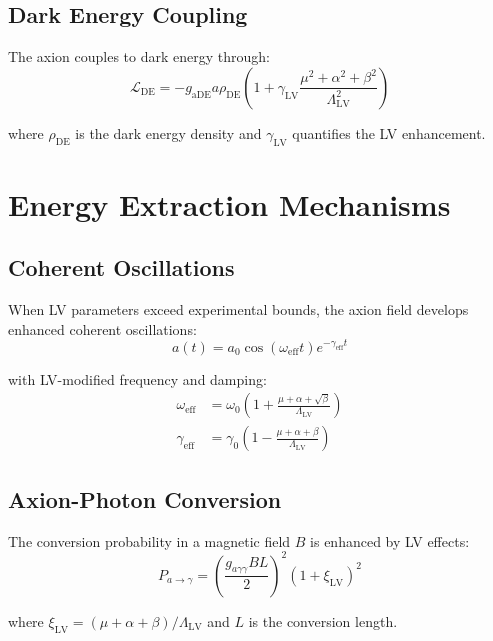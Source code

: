 \documentclass[11pt]{article}
\begin{document}
\subsection{Dark Energy Coupling}

The axion couples to dark energy through:
\begin{equation}
\mathcal{L}_{\text{DE}} = -g_{\text{aDE}} a \rho_{\text{DE}} \left(1 + \gamma_{\text{LV}} \frac{\mu^2 + \alpha^2 + \beta^2}{\Lambda_{\text{LV}}^2}\right)
\end{equation}

where $\rho_{\text{DE}}$ is the dark energy density and $\gamma_{\text{LV}}$ quantifies the LV enhancement.

\section{Energy Extraction Mechanisms}

\subsection{Coherent Oscillations}

When LV parameters exceed experimental bounds, the axion field develops enhanced coherent oscillations:
\begin{equation}
a(t) = a_0 \cos\left(\omega_{\text{eff}} t\right) e^{-\gamma_{\text{eff}} t}
\end{equation}

with LV-modified frequency and damping:
\begin{align}
\omega_{\text{eff}} &= \omega_0 \left(1 + \frac{\mu + \alpha + \sqrt{\beta}}{\Lambda_{\text{LV}}}\right) \\
\gamma_{\text{eff}} &= \gamma_0 \left(1 - \frac{\mu + \alpha + \beta}{\Lambda_{\text{LV}}}\right)
\end{align}

\subsection{Axion-Photon Conversion}

The conversion probability in a magnetic field $B$ is enhanced by LV effects:
\begin{equation}
P_{a\rightarrow\gamma} = \left(\frac{g_{a\gamma\gamma} B L}{2}\right)^2 \left(1 + \xi_{\text{LV}}\right)^2
\end{equation}

where $\xi_{\text{LV}} = (\mu + \alpha + \beta)/\Lambda_{\text{LV}}$ and $L$ is the conversion length.
\end{document}
